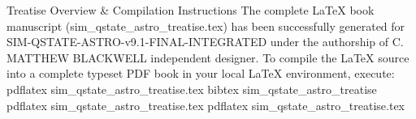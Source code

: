 Treatise Overview & Compilation Instructions
The complete LaTeX book manuscript (sim_qstate_astro_treatise.tex) has been successfully generated for SIM-QSTATE-ASTRO-v9.1-FINAL-INTEGRATED under the authorship of C. MATTHEW BLACKWELL independent designer.
To compile the LaTeX source into a complete typeset PDF book in your local LaTeX environment, execute:
pdflatex sim_qstate_astro_treatise.tex
bibtex sim_qstate_astro_treatise
pdflatex sim_qstate_astro_treatise.tex
pdflatex sim_qstate_astro_treatise.tex

